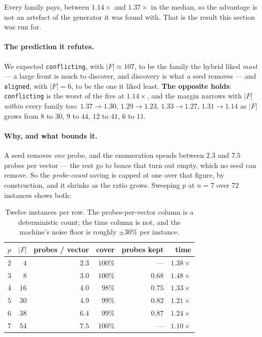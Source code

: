 \documentclass[11pt,a4paper]{article}
\begin{document}
\noindent
Every family pays, between $1.14\times$ and $1.37\times$ in the median, so the
advantage is not an artefact of the generator it was found with.  That is the
result this section was run for.

\paragraph{The prediction it refutes.}  We expected \texttt{conflicting}, with
$|F| \approx 107$, to be the family the hybrid liked \emph{most} --- a large
front is much to discover, and discovery is what a seed removes --- and
\texttt{aligned}, with $|F| = 6$, to be the one it liked least.  \textbf{The
opposite holds}: \texttt{conflicting} is the worst of the five at
$1.14\times$, and the margin narrows with $|F|$ \emph{within} every family too:
$1.37 \to 1.30$, $1.29 \to 1.23$, $1.33 \to 1.27$, $1.31 \to 1.14$ as $|F|$
grows from $8$ to $30$, $9$ to $44$, $12$ to $41$, $6$ to $11$.

\paragraph{Why, and what bounds it.}  A seed removes \emph{one} probe, and the
enumeration spends between $2.3$ and $7.5$ probes per vector --- the rest go to
boxes that turn out empty, which no seed can remove.  So the \emph{probe-count}
saving is capped at one over that figure, by construction, and it shrinks as
the ratio grows.  Sweeping $p$ at $n = 7$ over 72 instances shows both:

\begin{table}[h]
\centering
\caption{Twelve instances per row.  The probes-per-vector column is a
deterministic count; the time column is not, and the machine's noise floor is
roughly $\pm 30\%$ per instance.}
\label{tab:psweep}
\begin{tabular}{crrrrr}
\toprule
$p$ & $|F|$ & probes / vector & cover & probes kept & time \\
\midrule
$2$ & $4$  & $2.3$ & $100\%$ & ---     & $1.38\times$ \\
$3$ & $8$  & $3.0$ & $100\%$ & $0.68$  & $1.48\times$ \\
$4$ & $16$ & $4.0$ & $98\%$  & $0.75$  & $1.33\times$ \\
$5$ & $30$ & $4.9$ & $99\%$  & $0.82$  & $1.21\times$ \\
$6$ & $38$ & $6.4$ & $99\%$  & $0.87$  & $1.24\times$ \\
$7$ & $54$ & $7.5$ & $100\%$ & ---     & $1.10\times$ \\
\bottomrule
\end{tabular}
\end{table}
\end{document}
